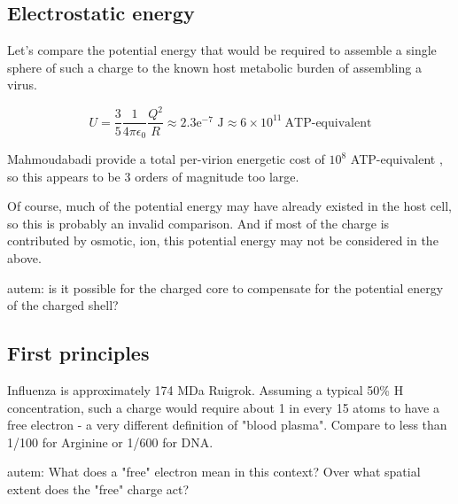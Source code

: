 \documentclass[paper.tex]{subfiles}
\begin{document}
\subsection{Electrostatic energy}

Let's compare the potential energy that would be required to assemble a single sphere of such a charge to the known host metabolic burden of assembling a virus.


$$ U = \frac{3}{5}  \frac{1}{4 \pi \epsilon_0} \frac{Q^2}{R} \approx 2.3\text{e}^{-7} \text{ J} \approx 6 \times 10^{11}\  \text{ATP-equivalent} $$



Mahmoudabadi\cite{Energetic2017} provide a total per-virion energetic cost of $10^8 $ ATP-equivalent , so this appears to be 3 orders of magnitude too large.

Of course, much of the potential energy may have already existed in the host cell, so this is probably an invalid comparison. And if most of the charge is contributed by osmotic, ion, this potential energy may not be considered in the above. 

\begin{autem}
	autem: is it possible for the charged core to compensate for the potential energy of the charged shell?
\end{autem}

\subsection{First principles}

Influenza is approximately 174 MDa Ruigrok. Assuming a typical 50\% H concentration, such a charge would require about 1 in every 15 atoms to have a free electron - a very different definition of "blood plasma". Compare to less than 1/100 for Arginine or 1/600 for DNA. 

\begin{autem}
	autem: What does a "free" electron mean in this context? Over what spatial extent does the "free" charge act?
\end{autem}
\end{document}
